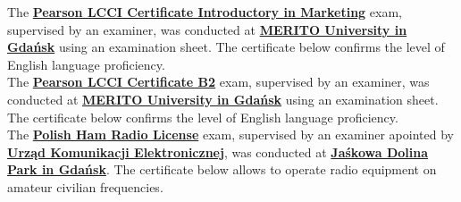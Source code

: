 \documentclass[theme]{cv_einstein}
\begin{document}
\begin{paracol}{2}
\begin{rightcolumn}
            {The \href{https://drive.google.com/file/d/1vBCEezspA7uQ0AJuSDX23JJqBxelfT__/view}{\textbf{Pearson LCCI Certificate Introductory in Marketing}} exam, supervised by an examiner, was conducted at \href{https://www.merito.pl/english/gdansk/}{\textbf{MERITO University in Gdańsk}} using an examination sheet. The certificate below confirms the level of English language proficiency.}
            \vspace{\itemspace}\\
            {The \href{https://drive.google.com/file/d/13rLS1UrRYQnpc4gBlC56gpBl9o_awkVq/view}{\textbf{Pearson LCCI Certificate B2}} exam, supervised by an examiner, was conducted at \href{https://www.merito.pl/english/gdansk/}{\textbf{MERITO University in Gdańsk}} using an examination sheet. The certificate below confirms the level of English language proficiency.}
            \vspace{\itemspace}\\
            {The \href{https://www.dziennikustaw.gov.pl/D2015000001001.pdf}{\textbf{Polish Ham Radio License}} exam, supervised by an examiner apointed by \href{https://www.uke.gov.pl/}{\textbf{Urząd Komunikacji Elektronicznej}}, was conducted at \href{https://infogdansk.pl/park-jaskowej-doliny/}{\textbf{Jaśkowa Dolina Park in Gdańsk}}. The certificate below allows to operate radio equipment on amateur civilian frequencies.}



\end{rightcolumn}
\end{paracol}
\end{document}
